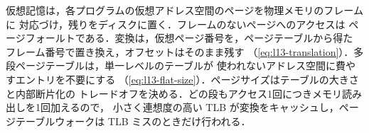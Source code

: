 \documentclass[../main.tex]{subfiles}
\begin{document}
\begin{keypoint}[章のまとめ]
  仮想記憶は，各プログラムの仮想アドレス空間のページを物理メモリのフレームに
  対応づけ，残りをディスクに置く．フレームのないページへのアクセスは
  ページフォールトである．変換は，仮想ページ番号を，ページテーブルから得た
  フレーム番号で置き換え，オフセットはそのまま残す
  （\cref{eq:l13-translation}）．多段ページテーブルは，単一レベルのテーブルが
  使われないアドレス空間に費やすエントリを不要にする
  （\cref{eq:l13-flat-size}）．ページサイズはテーブルの大きさと内部断片化の
  トレードオフを決める．どの段もアクセス1回につきメモリ読み出しを1回加えるので，
  小さく連想度の高い TLB が変換をキャッシュし，ページテーブルウォークは TLB
  ミスのときだけ行われる．
\end{keypoint}
\end{document}
